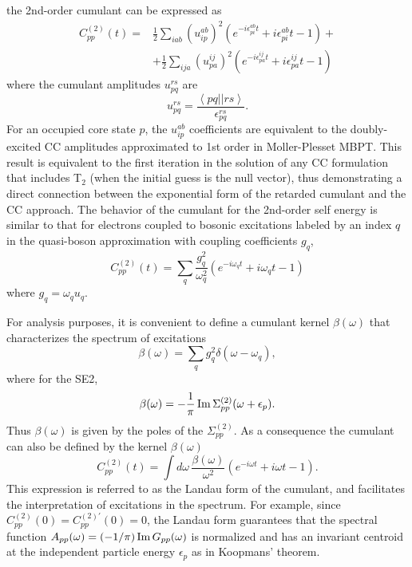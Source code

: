 \documentclass[aps,prb,twocolumn,groupaddress,floatfix]{revtex4}
\begin{document}
the 2nd-order cumulant can be expressed as
\begin{equation}
\label{eqn:cum_coupl}
\begin{split}
C^{(2)}_{pp}(t) =&
\frac{1}{2}\sum_{iab} \left(u_{ip}^{ab}\right)^2
\left(e^{-i \epsilon_{pi}^{ab} t} +i \epsilon_{pi}^{ab} t -1 \right)  + \\&
+\frac{1}{2}\sum_{ija} \left(u_{pa}^{ij}\right)^2
\left(e^{-i \epsilon_{pa}^{ij} t} +i \epsilon_{pa}^{ij} t -1 \right)
\end{split}
\end{equation}
where the cumulant amplitudes $u_{pq}^{rs}$ are 
\begin{equation}
\label{}
u_{pq}^{rs} =
\frac{\left< pq \left| \right| rs \right>}
{\epsilon_{pq}^{rs}}.
\end{equation}
For an occupied core state $p$, the $u_{ip}^{ab}$ coefficients are equivalent to the doubly-excited CC amplitudes approximated to 1st order in Moller-Plesset
MBPT.\cite{crawford2000introduction}
 This result is equivalent to the first iteration in the solution of any CC formulation that includes T$_2$ (when the initial guess is the null vector),\cite{crawford2000introduction} thus demonstrating a direct connection between the exponential form of the retarded cumulant and the CC approach. The behavior of the cumulant
for the 2nd-order self energy is similar to that for electrons coupled to
bosonic excitations labeled by an index $q$ in the quasi-boson approximation
with coupling coefficients $g_q$,\cite{Hedin99review} 
\begin{equation}
C^{(2)}_{pp}(t) = \sum_{q} \frac {g_q^2}{\omega_q^2}
\left(e^{-i \omega_q t} +i \omega_q t -1 \right)
\end{equation}
where $g_q =\omega_q u_q$.

For analysis purposes, it is convenient to define a cumulant
kernel $\beta(\omega)$ that characterizes the spectrum of excitations
\begin{equation}
\beta(\omega) = \sum_q g_q^2 \delta(\omega-\omega_q) ,
\end{equation}
where for the SE2,
\begin{equation}
\beta(\omega) = -\frac{1}{\pi}\, {\rm Im}\, \Sigma^{(2)}_{pp}(\omega+\epsilon_p).
\end{equation}
Thus $\beta(\omega)$ is given by the poles of the $\Sigma^{(2)}_{pp}$.
As a consequence the cumulant can also be defined by the kernel $\beta(\omega)$
\begin{equation}
C^{(2)}_{pp}(t) = \int d\omega\, \frac{\beta(\omega)}{\omega^2}
\left(e^{-i \omega t} +i \omega t -1 \right).
\end{equation}
This expression is referred to as the Landau form of the cumulant, and
facilitates the interpretation of excitations in the spectrum.
For example, since $C^{(2)}_{pp}(0)=C^{(2)'}_{pp}(0)=0$, the Landau form
guarantees that the spectral function
$A_{pp}(\omega)=(-1/\pi)\,{\rm Im}\, G_{pp}(\omega)$
is normalized and has an invariant centroid at the independent particle energy
$\epsilon_p$ as in Koopmans' theorem.
\end{document}
